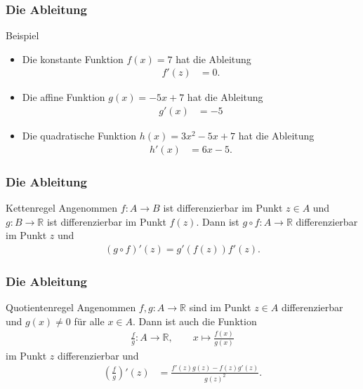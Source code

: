 \documentclass{beamer}
\newcommand\RR{\mathbb R}
\newcommand\bc[1]{\left({#1}\right)}
\newcommand\bcfr[2]{\bc{\frac{#1}{#2}}}
\newcommand{\ue}{\"u}
\newcommand{\mytitle}{Die Ableitung}
\begin{document}
\begin{frame}\frametitle{\mytitle}
	\begin{block}{Beispiel}
	\begin{itemize}
		\item Die konstante Funktion $f(x)=7$ hat die Ableitung
		\begin{align*}
			f'(z)&=0.
		\end{align*}
	\item Die affine Funktion $ g(x)=-5x+7 $ hat die Ableitung
		\begin{align*}
			g'(x)&=-5
		\end{align*}
	\item Die quadratische Funktion $ h(x)=3x^2-5x+7 $ hat die Ableitung
		\begin{align*}
			h'(x)&=6x-5.
		\end{align*}
	\end{itemize}
	\end{block}
\end{frame}

\begin{frame}\frametitle{\mytitle}
	\begin{block}{Kettenregel}
		Angenommen $f:A\to B$ ist differenzierbar im Punkt $z\in A$ und $g:B\to\RR$ ist differenzierbar im Punkt $f(z)$. 
		Dann ist $g\circ f:A\to\RR$ differenzierbar im Punkt $z$ und
		\begin{align*}
			(g\circ f)'(z)=g'(f(z))f'(z).
		\end{align*}
	\end{block}
\end{frame}

\begin{frame}\frametitle{\mytitle}
	\begin{block}{Quotientenregel}
		Angenommen $f,g:A\to\RR$ sind im Punkt $z\in A$ differenzierbar und $g(x)\neq0$ f\ue r alle $x\in A$.
		Dann ist auch die Funktion
		\begin{align*}
			\frac{f}{g}:A\to\RR,\qquad x\mapsto\frac{f(x)}{g(x)}
		\end{align*}
		im Punkt $z$ differenzierbar und
		\begin{align*}
			\bcfr fg'(z)&=\frac{f'(z)g(z)-f(z)g'(z)}{g(z)^2}.
		\end{align*}
	\end{block}
\end{frame}
\end{document}
